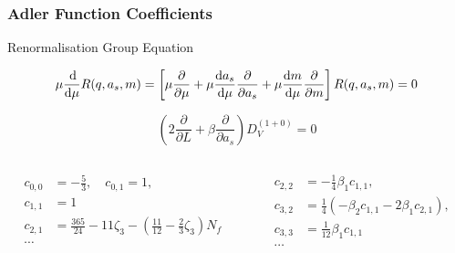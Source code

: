 \documentclass[fleqn]{beamer}
\begin{document}
\begin{frame}
  \frametitle{Adler Function Coefficients}
  \centering
  \begin{block}{Renormalisation Group Equation}
    \begin{ceqn}
      \begin{equation}
        \mu \frac{\dif}{\dif \mu} R(q, a_s, m) = \left[ \mu \frac{\partial}{\partial \mu} + \mu \frac{\dif a_s}{\dif \mu} \frac{\partial}{\partial a_s} + \mu \frac{\dif m}{\dif \mu} \frac{\partial}{\partial m} \right] R(q, a_s, m) = 0
      \end{equation}
    \end{ceqn}
  \end{block}
  \begin{ceqn}
    \begin{equation}
      \left(2 \frac{\partial}{\partial L} + \beta \frac{\partial}{\partial a_s} \right) D_V^{(1+0)} = 0
    \end{equation}
  \end{ceqn}
  \begin{columns}
    \begin{column}{.5\textwidth}
      \begin{scriptsize}
        \begin{equation}
          \begin{split}
            c_{0,0} &= -\frac{5}{3}, \quad c_{0,1} = 1, \\
            c_{1,1} &= 1 \\
            c_{2,1} &= \frac{365}{24} - 11 \zeta_3 - ( \frac{11}{12} - \frac{2}{3}\zeta_3 ) N_f \\
            \cdots
          \end{split}
        \end{equation}
      \end{scriptsize}
    \end{column}
    \begin{column}{.5\textwidth}
      \begin{scriptsize}
        \begin{equation}
          \begin{split}
            c_{2,2} &= -\frac{1}{4} \beta_1 c_{1,1}, \\
            c_{3,2} &= \frac{1}{4}(-\beta_2 c_{1,1} - 2 \beta_1 c_{2,1}), \\
            c_{3,3} &= \frac{1}{12}\beta_1 c_{1,1} \\
            \cdots
          \end{split}
        \end{equation}
      \end{scriptsize}
    \end{column}
  \end{columns}
\end{frame}
\end{document}
